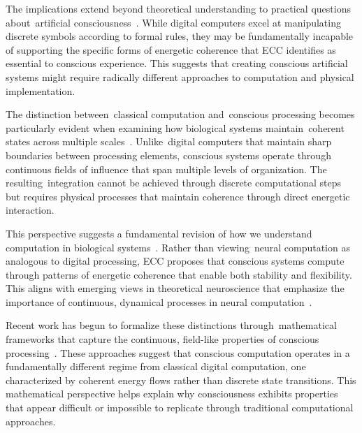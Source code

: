 The implications extend beyond theoretical understanding to practical questions about~artificial consciousness~\cite{butlin2023consciousnessartificialintelligenceinsights}. While digital computers excel at manipulating discrete symbols according to formal rules, they may be fundamentally incapable of supporting the specific forms of energetic coherence that ECC identifies as essential to conscious experience. This suggests that creating conscious artificial systems might require radically different approaches to computation and physical implementation.

The distinction between~classical computation and~conscious processing becomes particularly evident when examining how biological systems maintain~coherent states across multiple scales~\cite{breakspear2005dynamics}. Unlike~digital computers that maintain sharp boundaries between processing elements, conscious systems operate through continuous fields of influence that span multiple levels of organization. The resulting~integration cannot be achieved through discrete computational steps but requires physical processes that maintain coherence through direct energetic interaction.

This perspective suggests a fundamental revision of how we understand computation in biological systems~\cite{freeman2007}. Rather than viewing~neural computation as analogous to digital processing, ECC proposes that conscious systems compute through patterns of energetic coherence that enable both stability and flexibility. This aligns with emerging views in theoretical neuroscience that emphasize the importance of continuous, dynamical processes in neural computation~\cite{kelso2012}.

Recent work has begun to formalize these distinctions through~mathematical frameworks that capture the continuous, field-like properties of conscious processing~\cite{da2024mathematical}. These approaches suggest that conscious computation operates in a fundamentally different regime from classical digital computation, one characterized by coherent energy flows rather than discrete state transitions. This mathematical perspective helps explain why consciousness exhibits properties that appear difficult or impossible to replicate through traditional computational approaches.

